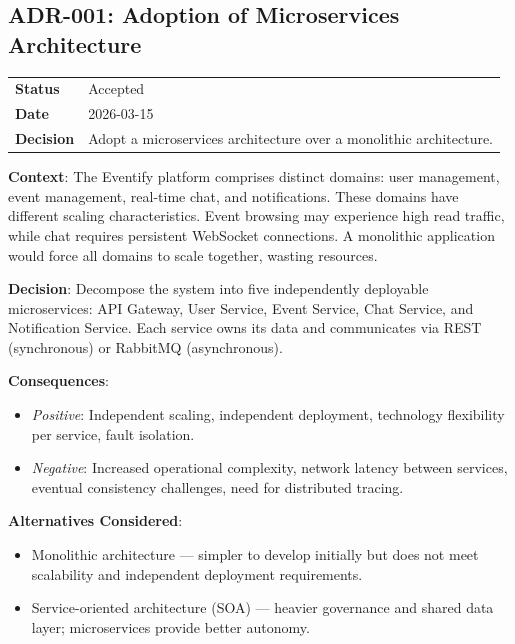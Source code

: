 \subsection{ADR-001: Adoption of Microservices Architecture}

\begin{tabular}{p{3cm}p{10cm}}
\textbf{Status} & Accepted \\
\textbf{Date} & 2026-03-15 \\
\textbf{Decision} & Adopt a microservices architecture over a monolithic architecture. \\
\end{tabular}

\textbf{Context}: The Eventify platform comprises distinct domains: user management, event management, real-time chat, and notifications. These domains have different scaling characteristics. Event browsing may experience high read traffic, while chat requires persistent WebSocket connections. A monolithic application would force all domains to scale together, wasting resources.

\textbf{Decision}: Decompose the system into five independently deployable microservices: API Gateway, User Service, Event Service, Chat Service, and Notification Service. Each service owns its data and communicates via REST (synchronous) or RabbitMQ (asynchronous).

\textbf{Consequences}:
\begin{itemize}
    \item \textit{Positive}: Independent scaling, independent deployment, technology flexibility per service, fault isolation.
    \item \textit{Negative}: Increased operational complexity, network latency between services, eventual consistency challenges, need for distributed tracing.
\end{itemize}

\textbf{Alternatives Considered}:
\begin{itemize}
    \item Monolithic architecture --- simpler to develop initially but does not meet scalability and independent deployment requirements.
    \item Service-oriented architecture (SOA) --- heavier governance and shared data layer; microservices provide better autonomy.
\end{itemize}
